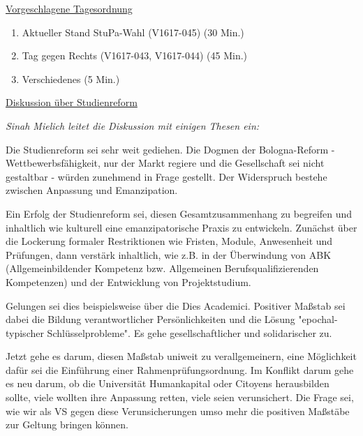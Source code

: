 \documentclass[ngerman,headheight=70pt]{scrartcl}
\begin{document}
    \newpage
    \underline{Vorgeschlagene Tagesordnung}
    \begin{enumerate}[label={\textbf{Top \theenumi}},leftmargin=*]
        \item Aktueller Stand StuPa-Wahl (V1617-045) (30 Min.)
        \item Tag gegen Rechts (V1617-043, V1617-044) (45 Min.)
        \item Verschiedenes (5 Min.)
    \end{enumerate}

    \newpage


    {\Large \underline{Diskussion über Studienreform}}

    \textit{Sinah Mielich leitet die Diskussion mit einigen Thesen ein:}

    Die Studienreform sei sehr weit gediehen. Die Dogmen der Bologna-Reform -
    Wettbewerbsfähigkeit, nur der Markt regiere und die Gesellschaft sei nicht
    gestaltbar - würden zunehmend in Frage gestellt. Der Widerspruch bestehe
    zwischen Anpassung und Emanzipation.

    Ein Erfolg der Studienreform sei, diesen Gesamtzusammenhang zu begreifen und
    inhaltlich wie kulturell eine emanzipatorische Praxis zu entwickeln. Zunächst
    über die Lockerung formaler Restriktionen wie Fristen, Module, Anwesenheit
    und Prüfungen, dann verstärk inhaltlich, wie z.B. in der Überwindung von ABK
    (Allgemeinbildender Kompetenz bzw. Allgemeinen Berufsqualifizierenden
    Kompetenzen) und der Entwicklung von Projektstudium.

    Gelungen sei dies beispielsweise über die Dies Academici. Positiver Maßstab
    sei dabei die Bildung verantwortlicher Persönlichkeiten und die Lösung
    "epochal-typischer Schlüsselprobleme". Es gehe gesellschaftlicher und solidarischer
    zu.

    Jetzt gehe es darum, diesen Maßstab uniweit zu verallgemeinern, eine
    Möglichkeit dafür sei die Einführung einer Rahmenprüfungsordnung. Im
    Konflikt darum gehe es neu darum, ob die Universität Humankapital oder
    Citoyens herausbilden sollte, viele wollten ihre Anpassung retten, viele
    seien verunsichert. Die Frage sei, wie wir als VS gegen diese
    Verunsicherungen umso mehr die positiven Maßstäbe zur Geltung bringen können.
\end{document}
